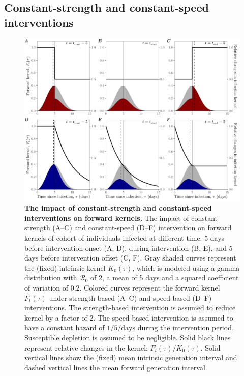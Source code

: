 \documentclass[12pt]{article}
\newcommand{\Rx}[1]{\ensuremath{{\mathcal R}_{#1}}\xspace}
\newcommand{\Ro}{\Rx{0}}
\begin{document}
\subsection{Constant-strength and constant-speed interventions}

\begin{figure}[!th]
\includegraphics[width=1\textwidth]{pop_ind_compare.pdf}
\caption{
\textbf{The impact of constant-strength and constant-speed interventions on forward kernels.}
The impact of constant-strength (A--C) and constant-speed (D--F) intervention on forward kernels of cohort of individuals infected at different time:
5 days before intervention onset (A, D), during intervention (B, E), and 5 days before intervention offset (C, F).
Gray shaded curves represent the (fixed) intrinsic kernel $K_0(\tau)$, which is modeled using a gamma distribution with $\Ro$ of 2, a mean of 5 days and a squared coefficient of variation of 0.2.
Colored curves represent the forward kernel $F_t(\tau)$ under strength-based (A--C) and speed-based (D--F) interventions.
The strength-based intervention is assumed to reduce kernel by a factor of 2.
The speed-based intervention is assumed to have a constant hazard of $1/5/\textrm{days}$ during the intervention period.
Susceptible depletion is assumed to be negligible.
Solid black lines represent relative changes in the kernel: $F_t(\tau)/K_0(\tau)$.
Solid vertical lines show the (fixed) mean intrinsic generation interval and dashed vertical lines the mean forward generation interval.
}
\label{fig:indpop}
\end{figure}
\end{document}
